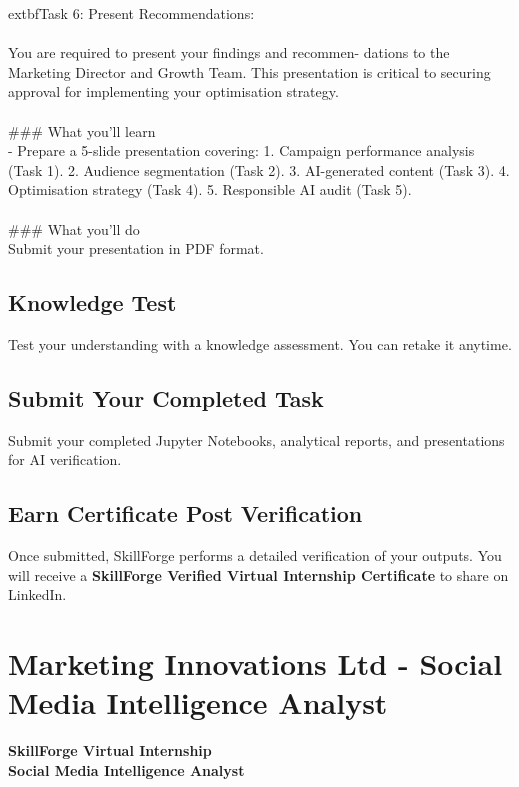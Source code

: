 \documentclass{article}
\begin{document}
	extbf{Task 6:} Present Recommendations:  \\
 \\
 You are required to present your findings and recommen- dations to the Marketing Director and Growth Team. This presentation is critical to securing approval for implementing your optimisation strategy. \\
 \\
### What you'll learn \\
- Prepare a 5-slide presentation covering: 1. Campaign performance analysis (Task 1). 2. Audience segmentation (Task 2). 3. AI-generated content (Task 3). 4. Optimisation strategy (Task 4). 5. Responsible AI audit (Task 5). \\
 \\
### What you'll do \\
Submit your presentation in PDF format.

\subsection*{Knowledge Test}
Test your understanding with a knowledge assessment. You can retake it anytime.\\

\subsection*{Submit Your Completed Task}
Submit your completed Jupyter Notebooks, analytical reports, and presentations for AI verification.\\

\subsection*{Earn Certificate Post Verification}
Once submitted, SkillForge performs a detailed verification of your outputs. You will receive a \textbf{SkillForge Verified Virtual Internship Certificate} to share on LinkedIn.\\

\newpage

\section{Marketing Innovations Ltd - Social Media Intelligence Analyst}

\textbf{SkillForge Virtual Internship} \\
\textbf{Social Media Intelligence Analyst} \\
\end{document}
